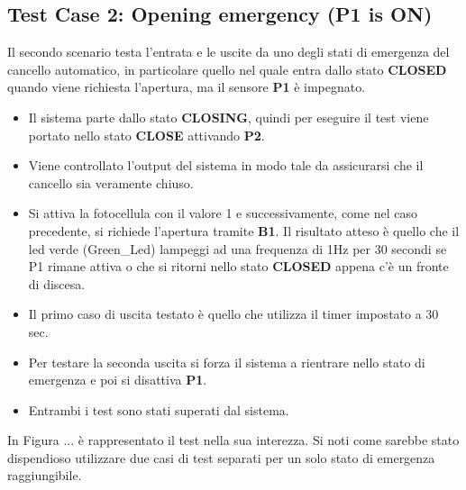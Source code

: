 \documentclass[12pt]{article}
\begin{document}
\subsection{Test Case 2: Opening emergency (P1 is ON)}

Il secondo scenario testa l'entrata e le uscite da uno degli stati di emergenza del cancello automatico, in particolare quello nel quale entra dallo stato \textbf{CLOSED} quando viene richiesta l'apertura, ma il sensore \textbf{P1} è impegnato.

\begin{itemize}
    \item Il sistema parte dallo stato \textbf{CLOSING}, quindi per eseguire il test viene portato nello stato \textbf{CLOSE} attivando \textbf{P2}.
    \item Viene controllato l'output del sistema in modo tale da assicurarsi che il cancello sia veramente chiuso.
    \item Si attiva la fotocellula con il valore 1 e successivamente, come nel caso precedente, si richiede l'apertura tramite \textbf{B1}. Il risultato atteso è quello che il led verde (Green\_Led) lampeggi ad una frequenza di 1Hz per 30 secondi se P1 rimane attiva o che si ritorni nello stato \textbf{CLOSED} appena c'è un fronte di discesa.
    \item Il primo caso di uscita testato è quello che utilizza il timer impostato a 30 sec.
    \item Per testare la seconda uscita si forza il sistema a rientrare nello stato di emergenza e poi si disattiva \textbf{P1}.
    \item Entrambi i test sono stati superati dal sistema.
\end{itemize}

In Figura ... è rappresentato il test nella sua interezza. Si noti come sarebbe stato dispendioso utilizzare due casi di test separati per un solo stato di emergenza raggiungibile.
\end{document}
